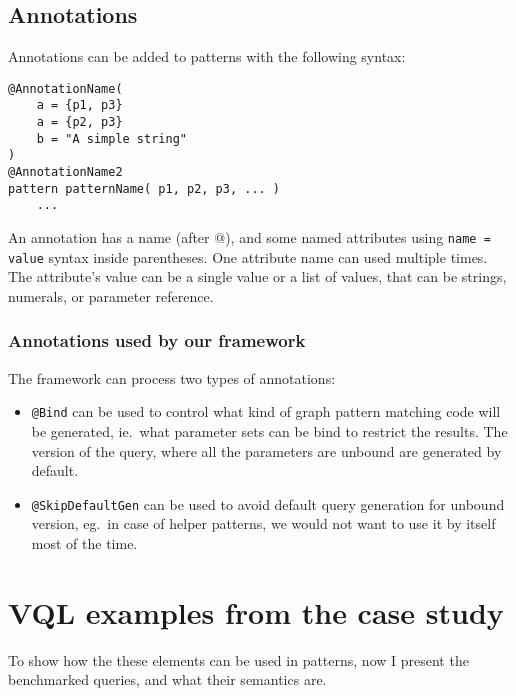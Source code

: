 \subsection{Annotations}

\begin{minipage}{\textwidth}
Annotations can be added to patterns with the following syntax:
\begin{lstlisting}[language=vql]
@AnnotationName(
	a = {p1, p3}
	a = {p2, p3}
	b = "A simple string"
)
@AnnotationName2
pattern patternName( p1, p2, p3, ... )
	...
\end{lstlisting}
\end{minipage}
\vspace{\belowdisplayskip}

An annotation has a name (after @), and some named attributes using \texttt{name = value} syntax inside parentheses.
One attribute name can used multiple times. 
The attribute's value can be a single value or a list of values, that can be strings, numerals, or parameter reference.


\subsubsection{Annotations used by our framework}

The framework can process two types of annotations:
\begin{itemize}
	\item \texttt{@Bind} can be used to control what kind of graph pattern matching code will be generated, ie.\ what parameter sets can be bind to restrict the results. The version of the query, where all the parameters are unbound are generated by default.
	
	\item \texttt{@SkipDefaultGen} can be used to avoid default query generation for unbound version, eg.\ in case of helper patterns, we would not want to use it by itself most of the time.
	
\end{itemize}


\section{VQL examples from the case study}

To show how the these elements can be used in patterns, now I present the benchmarked queries, and what their semantics are.

